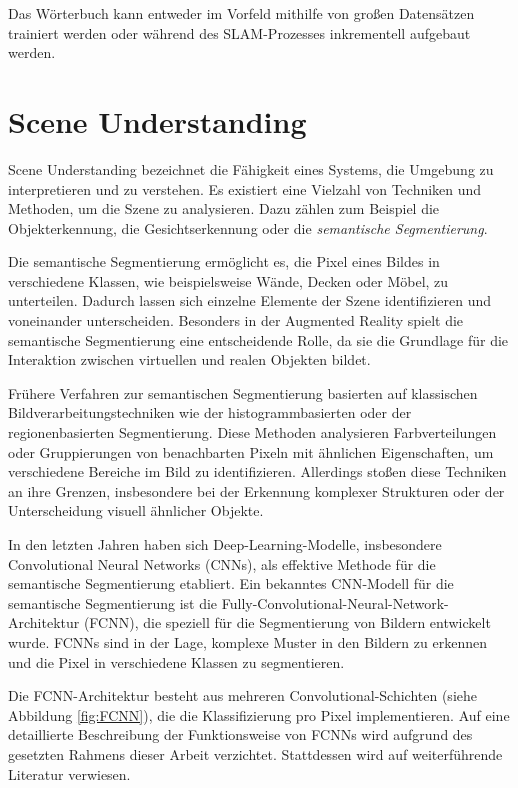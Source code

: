 Das Wörterbuch kann entweder im Vorfeld mithilfe von großen Datensätzen trainiert werden oder während des SLAM-Prozesses inkrementell aufgebaut werden. \cite{ta2023loopClosure, khan2015ibuild, gao2021vSLAM}

\section{Scene Understanding} \label{sec:SceneUnderstanding}

Scene Understanding bezeichnet die Fähigkeit eines Systems, die Umgebung zu interpretieren und zu verstehen. Es existiert eine Vielzahl von Techniken und Methoden, um die Szene zu analysieren. Dazu zählen zum Beispiel die Objekterkennung, die Gesichtserkennung oder die \emph{semantische Segmentierung}. \cite{szeliski2022computerVision}

Die semantische Segmentierung ermöglicht es, die Pixel eines Bildes in verschiedene Klassen, wie beispielsweise Wände, Decken oder Möbel, zu unterteilen. Dadurch lassen sich einzelne Elemente der Szene identifizieren und voneinander unterscheiden. Besonders in der Augmented Reality spielt die semantische Segmentierung eine entscheidende Rolle, da sie die Grundlage für die Interaktion zwischen virtuellen und realen Objekten bildet. \cite{szeliski2022computerVision, appledevdoc, arcoredevdoc}

Frühere Verfahren zur semantischen Segmentierung basierten auf klassischen Bildverarbeitungstechniken wie der histogrammbasierten oder der regionenbasierten Segmentierung. Diese Methoden analysieren Farbverteilungen oder Gruppierungen von benachbarten Pixeln mit ähnlichen Eigenschaften, um verschiedene Bereiche im Bild zu identifizieren. Allerdings stoßen diese Techniken an ihre Grenzen, insbesondere bei der Erkennung komplexer Strukturen oder der Unterscheidung visuell ähnlicher Objekte. \cite{szeliski2022computerVision}

In den letzten Jahren haben sich Deep-Learning-Modelle, insbesondere Convolutional Neural Networks (CNNs), als effektive Methode für die semantische Segmentierung etabliert. Ein bekanntes CNN-Modell für die semantische Segmentierung ist die Fully-Convolutional-Neural-Network-Architektur (FCNN), die speziell für die Segmentierung von Bildern entwickelt wurde. FCNNs sind in der Lage, komplexe Muster in den Bildern zu erkennen und die Pixel in verschiedene Klassen zu segmentieren. \cite{long2014fcnn}

Die FCNN-Architektur besteht aus mehreren Convolutional-Schichten (siehe Abbildung \ref{fig:FCNN}), die die Klassifizierung pro Pixel implementieren. Auf eine detaillierte Beschreibung der Funktionsweise von FCNNs wird aufgrund des gesetzten Rahmens dieser Arbeit verzichtet. Stattdessen wird auf weiterführende Literatur verwiesen. \cite{long2014fcnn, ronneberger2015unet}

